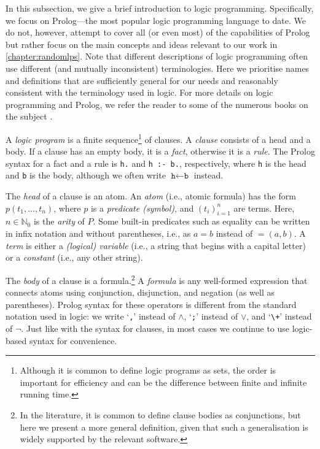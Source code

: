 In this subsection, we give a brief introduction to logic programming. Specifically, we focus on Prolog---the most popular logic programming language to date. We do not, however, attempt to cover all (or even most) of the capabilities of Prolog but rather focus on the main concepts and ideas relevant to our work in \cref{chapter:randomlps}. Note that different descriptions of logic programming often use different (and mutually inconsistent) terminologies. Here we prioritise names and definitions that are sufficiently general for our needs and reasonably consistent with the terminology used in logic. For more details on logic programming and Prolog, we refer the reader to some of the numerous books on the subject \citep{DBLP:books/daglib/0041598,DBLP:books/daglib/0067951}.

A \emph{logic program} is a finite sequence\footnote{Although it is common to define logic programs as sets, the order is important for efficiency and can be the difference between finite and infinite running time.} of clauses. A \emph{clause} consists of a head and a body. If a clause has an empty body, it is a \emph{fact}, otherwise it is a \emph{rule}. The Prolog syntax for a fact and a rule is \verb+h.+ and \verb+h :- b.+, respectively, where \texttt{h} is the head and \texttt{b} is the body, although we often write $\texttt{h} \gets \texttt{b}$ instead.

The \emph{head} of a clause is an atom. An \emph{atom} (i.e., atomic formula) has the form $p(t_1, \dots, t_n)$, where $p$ is a \emph{predicate (symbol)}, and $(t_i)_{i=1}^n$ are terms. Here, $n \in \mathbb{N}_0$ is the \emph{arity} of $P$. Some built-in predicates such as equality can be written in infix notation and without parentheses, i.e., as $a = b$ instead of $=(a, b)$. A \emph{term} is either a \emph{(logical) variable} (i.e., a string that begins with a capital letter) or a \emph{constant} (i.e., any other string).

The \emph{body} of a clause is a formula.\footnote{In the literature, it is common to define clause bodies as conjunctions, but here we present a more general definition, given that such a generalisation is widely supported by the relevant software.} A \emph{formula} is any well-formed expression that connects atoms using conjunction, disjunction, and negation (as well as parentheses). Prolog syntax for these operators is different from the standard notation used in logic: we write `\verb+,+' instead of $\land$, `\verb+;+' instead of $\lor$, and `\verb#\+#' instead of $\neg$. Just like with the syntax for clauses, in most cases we continue to use logic-based syntax for convenience.

